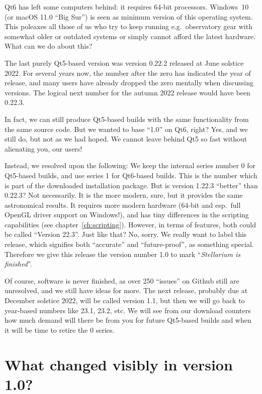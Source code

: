 Qt6 has left some computers behind: it requires 64-bit
processors. Windows~10 (or macOS 11.0 ``Big Sur'') is seen as minimum version of this operating
system. This poleaxes all those of us who try to keep running
e.g.\ observatory gear with somewhat older or outdated systems or
simply cannot afford the latest hardware.
What can we do about this?


The last purely Qt5-based version was version 0.22.2 released at June
solstice 2022. For several years now, the number after the zero has
indicated the year of release, and many users have already dropped the
zero mentally when discussing versions.  The logical next number for
the autumn 2022 release would have been 0.22.3.

In fact, we can still produce Qt5-based builds with the same
functionality from the same source code. But we wanted to base ``1.0''
on Qt6, right? Yes, and we still do, but not as we had hoped. We
cannot leave behind Qt5 so fast without alienating you, our users!


Instead, we resolved upon the following: We keep the internal series
number 0 for Qt5-based builds, and use series 1 for Qt6-based
builds. This is the number which is part of the downloaded
installation package.  But is version 1.22.3 ``better'' than 0.22.3?
Not necessarily. It is the more modern, sure, but it provides the same
astronomical results. It requires more modern hardware (64-bit and
esp.\ full OpenGL driver support on Windows!), and has tiny
differences in the scripting capabilities (see
chapter~\ref{ch:scripting}). However, in terms of features, both could
be called ``Version 22.3''. Just like that? No, sorry.
We really want to label this release, which signifies both ``accurate'' and
``future-proof'', as something special. Therefore we give this release
the version number 1.0 to mark ``\emph{Stellarium is finished}''.

Of course, software is never finished, as over 250 ``issues'' on
Github still are unresolved, and we still have ideas for more. The
next release, probably due at December solstice 2022, will be called
version 1.1, but then we will go back to year-based numbers like 23.1,
23.2, etc. We will see from our download counters how much demand will
there be from you for future Qt5-based builds and when it will be time to retire
the 0 series.


\section*{What changed visibly in version 1.0?}

